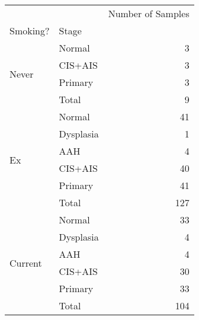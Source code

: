\begin{tabular}{l|lr}
\toprule
        &       & Number of Samples \\
Smoking? & Stage &                   \\
\midrule
\multirow{4}{*}{Never} & Normal &                 3 \\
        & CIS+AIS &                 3 \\
        & Primary &                 3 \\
        & Total &                 9 \\
\cline{1-3}
\multirow{6}{*}{Ex} & Normal &                41 \\
        & Dysplasia &                 1 \\
        & AAH &                 4 \\
        & CIS+AIS &                40 \\
        & Primary &                41 \\
        & Total &               127 \\
\cline{1-3}
\multirow{6}{*}{Current} & Normal &                33 \\
        & Dysplasia &                 4 \\
        & AAH &                 4 \\
        & CIS+AIS &                30 \\
        & Primary &                33 \\
        & Total &               104 \\
\bottomrule
\end{tabular}
